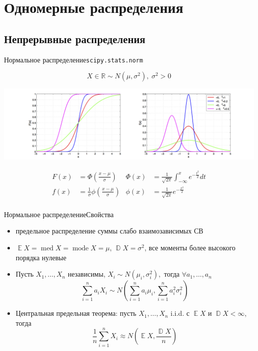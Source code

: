 \documentclass[11pt,pdf,utf8,hyperref={unicode},aspectratio=169]{beamer}
\def\RR{\mathbb{R}}
\DeclareMathOperator{\DD}{\mathbb{D}}
\DeclareMathOperator{\EE}{\mathbb{E}}
\DeclareMathOperator{\mmode}{mode}
\DeclareMathOperator{\med}{med}
\begin{document}
\section{Одномерные распределения}
\subsection{Непрерывные распределения}
\begin{frame}{Нормальное распределение}{\texttt{scipy.stats.norm}}

    $$X\in \RR \sim N\left(\mu, \sigma^2\right), \; \sigma^2>0$$
    \begin{center}
        \includegraphics[width=\textwidth]{norm.png}
    \end{center}
    \begin{align*}
         F\left(x\right) &= \Phi\left(\frac{x-\mu}{\sigma}\right)                &\Phi\left(x\right) &= \frac1{\sqrt{2\pi}} \int_{-\infty}^x e^{-\frac{t^2}{2}} dt\\
         f\left(x\right) &= \frac1{\sigma}\phi\left(\frac{x-\mu}{\sigma}\right)  &\phi\left(x\right) &= \frac1{\sqrt{2\pi}} e^{-\frac{x^2}{2}}\\
    \end{align*}
\end{frame}
\begin{frame}{Нормальное распределение}{Свойства}
	\begin{itemize}
	    \item предельное распределение суммы слабо взаимозависимых СВ
	    \item $\EE{X} = \med X = \mmode X = \mu$, $\DD{X}  = \sigma^2$,  все моменты более высокого порядка нулевые
    	\item Пусть $X_1,\dots,X_n$ независимы, \; $X_i\sim N\left(\mu_i, \sigma_i^2\right),$ тогда $\forall a_1,\dots,a_n$
    	$$\sum\limits_{i=1}^n a_i X_i \sim N\left(\sum_{i=1}^n a_i \mu_i, \sum_{i=1}^n a_i^2 \sigma_i^2\right)$$
    	\item Центральная предельная теорема: пусть $X_1,\dots,X_n$ i.i.d. с $\EE{X}$ и $\DD{X}<\infty$, тогда
    	$$\frac1{n}\sum_{i=1}^n X_i \approx N\left(\EE{X}, \frac{\DD{X}}{n}\right)$$
    \end{itemize}
\end{frame}
\end{document}
